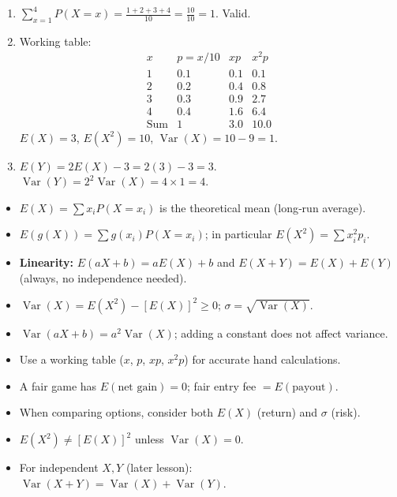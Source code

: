 \documentclass[11pt]{article}
\begin{document}
\begin{corrige}
\begin{enumerate}
\item $\sum_{x=1}^4 P(X=x) = \frac{1+2+3+4}{10} = \frac{10}{10} = 1$. Valid.
\item Working table:
\[
\begin{array}{c|c|c|c}
x & p=x/10 & xp & x^2p \\ \hline
1 & 0.1 & 0.1 & 0.1 \\
2 & 0.2 & 0.4 & 0.8 \\
3 & 0.3 & 0.9 & 2.7 \\
4 & 0.4 & 1.6 & 6.4 \\ \hline
\text{Sum} & 1 & 3.0 & 10.0
\end{array}
\]
$E(X)=3$, $E(X^2)=10$, $\operatorname{Var}(X)=10-9=1$.
\item $E(Y) = 2E(X)-3 = 2(3)-3 = 3$. $\operatorname{Var}(Y) = 2^2\operatorname{Var}(X) = 4\times1 = 4$.
\end{enumerate}
\end{corrige}

\begin{aretenir}
\begin{itemize}
\item $E(X) = \sum x_i P(X=x_i)$ is the theoretical mean (long‑run average).
\item $E(g(X)) = \sum g(x_i) P(X=x_i)$; in particular $E(X^2) = \sum x_i^2 p_i$.
\item \textbf{Linearity:} $E(aX+b) = aE(X)+b$ and $E(X+Y)=E(X)+E(Y)$ (always, no independence needed).
\item $\operatorname{Var}(X) = E(X^2) - [E(X)]^2 \ge 0$; $\sigma = \sqrt{\operatorname{Var}(X)}$.
\item $\operatorname{Var}(aX+b) = a^2 \operatorname{Var}(X)$; adding a constant does not affect variance.
\item Use a working table ($x$, $p$, $xp$, $x^2p$) for accurate hand calculations.
\item A fair game has $E(\text{net gain}) = 0$; fair entry fee $= E(\text{payout})$.
\item When comparing options, consider both $E(X)$ (return) and $\sigma$ (risk).
\item $E(X^2) \neq [E(X)]^2$ unless $\operatorname{Var}(X)=0$.
\item For independent $X,Y$ (later lesson): $\operatorname{Var}(X+Y)=\operatorname{Var}(X)+\operatorname{Var}(Y)$.
\end{itemize}
\end{aretenir}
\end{document}
